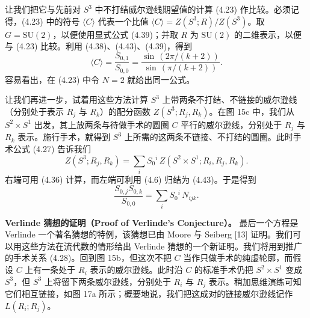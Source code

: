 \documentclass[11pt,a4paper]{article}
\begin{document}
让我们把它与先前对 $S^3$ 中不打结威尔逊线期望值的计算 (4.23) 作比较。必须记得，(4.23) 中的符号 $\langle C\rangle$ 代表一个比值 $\langle C\rangle=Z(S^3;R)/Z(S^3)$。取 $G=\mathrm{SU}(2)$，以便使用显式公式 (4.39)；并取 $R$ 为 $\mathrm{SU}(2)$ 的二维表示，以便与 (4.23) 比较。利用 (4.38)、(4.43)、(4.39)，得到
\begin{equation}
    \langle C\rangle = \frac{S_{0,1}}{S_{0,0}} = \frac{\sin\,(2\pi/(k+2))}{\sin\,(\pi/(k+2))}. \tag{4.44}
\end{equation}
容易看出，在 (4.23) 中令 $N=2$ 就给出同一公式。

让我们再进一步，试着用这些方法计算 $S^3$ 上带两条不打结、不链接的威尔逊线（分别处于表示 $R_j$ 与 $R_k$）的配分函数 $Z(S^3;R_j,R_k)$。在图 15c 中，我们从 $S^2\times S^1$ 出发，其上放两条与待做手术的圆圈 $C$ 平行的威尔逊线，分别处于 $R_j$ 与 $R_k$ 表示。施行手术，就得到 $S^3$ 上所需的这两条不链接、不打结的圆圈。此时手术公式 (4.27) 告诉我们
\begin{equation}
    Z(S^3;R_j,R_k) = \sum_i S_0{}^i\, Z(S^2\times S^1;R_i,R_j,R_k). \tag{4.45}
\end{equation}
右端可用 (4.36) 计算，而左端可利用 (4.6) 归结为 (4.43)。于是得到
\begin{equation}
    \frac{S_{0,j}S_{0,k}}{S_{0,0}} = \sum_i S_0{}^i\, N_{ijk}. \tag{4.46}
\end{equation}

\textbf{Verlinde 猜想的证明（Proof of Verlinde's Conjecture）。} 最后一个方程是 Verlinde 一个著名猜想的特例，该猜想已由 Moore 与 Seiberg [13] 证明。我们可以用这些方法在流代数的情形给出 Verlinde 猜想的一个新证明。我们将用到推广的手术关系 (4.28)。回到图 15b，但这次不把 $C$ 当作只做手术的纯虚轮廓，而假设 $C$ 上有一条处于 $R_i$ 表示的威尔逊线。此时沿 $C$ 的标准手术仍把 $S^2\times S^1$ 变成 $S^3$，但 $S^3$ 上将留下两条威尔逊线，分别处于 $R_i$ 与 $R_j$ 表示。稍加思维演练可知它们相互链接，如图 17a 所示；概要地说，我们把这成对的链接威尔逊线记作 $L(R_i;R_j)$。
\end{document}

